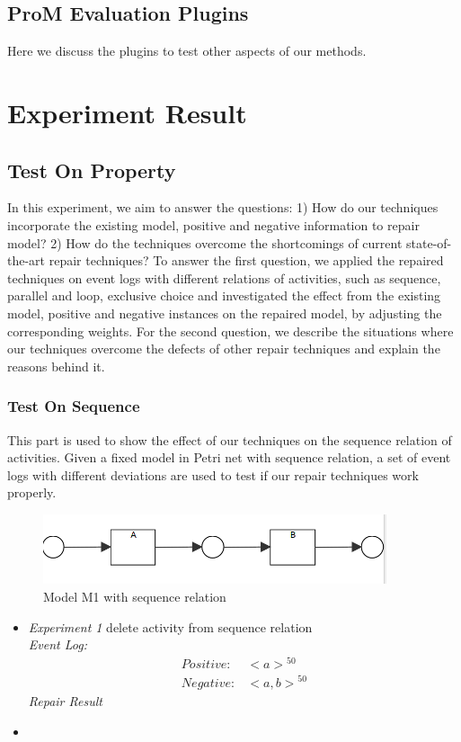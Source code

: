 \subsection{ProM Evaluation Plugins}
Here we discuss the plugins to test other aspects of our methods. 
\section{Experiment Result}
\subsection{Test On Property}
In this experiment, we aim to answer the questions: 1) How do our techniques incorporate the existing model, positive and negative information to repair model? 2) How do the techniques overcome the shortcomings of current state-of-the-art repair techniques?
To answer the first question, we applied the repaired techniques on event logs with different relations of activities, such as sequence, parallel and loop, exclusive choice and investigated the effect from the existing model, positive and negative instances on the repaired model, by adjusting the corresponding weights. For the second question, we describe the situations where our techniques overcome the defects of other repair techniques and explain the reasons behind it. 
\subsubsection{Test On Sequence}
This part is used to show the effect of our techniques on the sequence relation of activities. Given a fixed model in Petri net with sequence relation, a set of event logs with different deviations are used to test if our repair techniques work properly.
\begin{figure}
	\includegraphics[width=0.9\textwidth]{figures/evaluation/model_01_sequence.png}
	\caption{Model M1 with sequence relation}
	\label{fig:sequence-M1}
\end{figure} 
\begin{itemize}
	\item \emph{Experiment 1} delete activity from sequence relation \\
	
	\emph{Event Log: }
	\begin{align*}
	Positive:& {<a>}^{50} \\
	Negative:& {<a, b>}^{50}
	\end{align*}
	\emph{Repair Result}
	
	
	\item 
\end{itemize}
